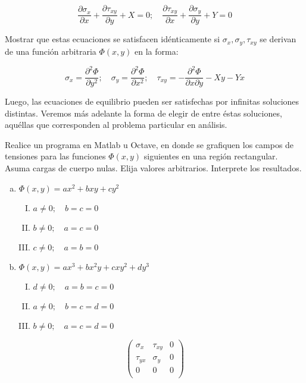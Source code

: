 \documentclass[a4paper,12pt,twoside,final,spanish]{article}
\begin{document}
\[
\frac{\partial\sigma_{x}}{\partial x}+\frac{\partial\tau_{xy}}{\partial y}+X=0;\quad\frac{\partial\tau_{xy}}{\partial x}+\frac{\partial\sigma_{y}}{\partial y}+Y=0
\]

Mostrar que estas ecuaciones se satisfacen idénticamente si $\sigma_{x},\sigma_{y},\tau_{xy}$ se derivan de una función arbitraria $\Phi(x,y)$ en la forma:

\[
\sigma_{x}=\frac{\partial^{2}\Phi}{\partial y^{2}};\quad
\sigma_{y}=\frac{\partial^{2}\Phi}{\partial x^{2}};\quad
\tau_{xy}=-\frac{\partial^{2}\Phi}{\partial x\partial y}-Xy-Yx
\]

Luego, las ecuaciones de equilibrio pueden ser satisfechas por infinitas soluciones distintas. Veremos más adelante la forma de elegir de entre éstas soluciones, aquéllas 
que corresponden al problema particular en análisis.

Realice un programa en Matlab u Octave, en donde se grafiquen los campos de tensiones  para las funciones $\Phi(x,y)$ siguientes en una región rectangular. Asuma cargas de cuerpo nulas. Elija valores arbitrarios. Interprete los resultados.

\begin{enumerate}[a.]
\item $\Phi(x,y)=ax^{2}+bxy+cy^{2}$
	\begin{enumerate}[I.]
	\item $a\neq 0;\quad b=c=0$
	\item $b\neq 0;\quad a=c=0$
	\item $c\neq 0;\quad a=b=0$
	\end{enumerate}
\item $\Phi(x,y)=ax^{3}+bx^{2}y+cxy^{2}+dy^{3}$
	\begin{enumerate}[I.]
	\item $d\neq 0;\quad a=b=c=0$
	\item $a\neq 0;\quad b=c=d=0$
	\item $b\neq 0;\quad a=c=d=0$
	\end{enumerate}
\end{enumerate}

\dotfill

\[
\left(\begin{matrix}
\sigma_{x} & \tau_{xy} & 0\\
\tau_{yx} & \sigma_{y} & 0\\
0 & 0 & 0\\
\end{matrix}\right)
\]\\
\end{document}
